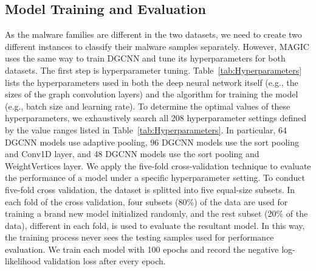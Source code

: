 \subsection{Model Training and Evaluation}
As the malware families are different in the two datasets, we need to create two different \sysname instances to classify their malware samples separately. However, MAGIC uses the same way to train DGCNN and tune its hyperparameters for both datasets.
The first step is hyperparameter tuning.
Table~\ref{tab:Hyperparameters} lists the hyperparameters used in both the deep neural network itself (e.g., the sizes of the graph convolution layers) and the algorithm for training the model (e.g., batch size and learning rate).
To determine the optimal values of these hyperparameters,
we exhaustively search all 208 hyperparameter settings defined by the value ranges listed in Table~\ref{tab:Hyperparameters}.
In particular, 64 DGCNN models use adaptive pooling, 96 DGCNN models use the sort pooling and Conv1D layer, and 48 DGCNN models use the sort pooling and WeightVertices layer.
We apply the five-fold cross-validation technique to evaluate the performance of a model under a specific hyperparameter setting.
To conduct five-fold cross validation, the dataset is splitted into five equal-size subsets.
In each fold of the cross validation, four subsets (80\%) of the data are used for training a brand new model initialized randomly,
and the rest subset (20\% of the data), different in each fold, is used to evaluate the resultant model.
In this way, the training process never sees the testing samples used for performance evaluation.
We train each model with 100 epochs and record the negative log-likelihood validation loss after every epoch.

